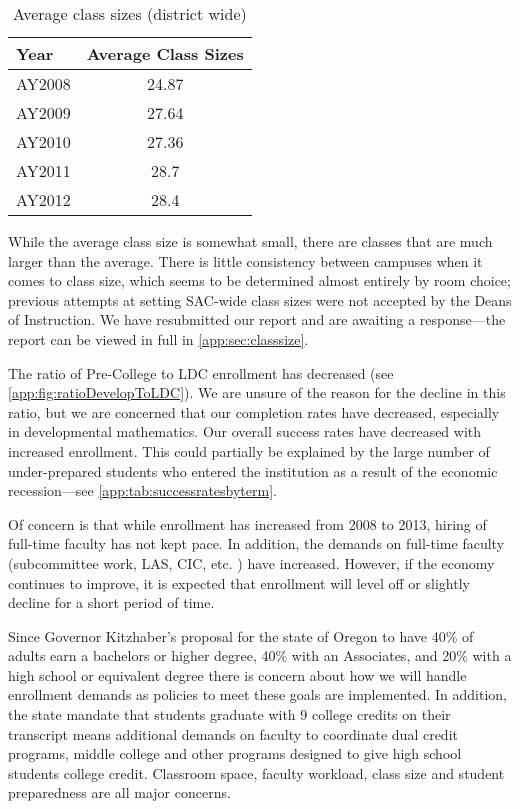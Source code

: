 \begin{table}[!htb]
	\centering
	\caption{Average class sizes (district wide)}
	\label{needs:tab:averageclasssize}
	\begin{tabular}{lS[table-format=2.2]}
		\toprule
		Year   & {Average Class Sizes } \\
		\midrule
		AY2008 & 24.87                  \\
		AY2009 & 27.64                  \\
		AY2010 & 27.36                  \\
		AY2011 & 28.7                   \\
		AY2012 & 28.4                   \\
		\bottomrule
	\end{tabular}
\end{table}

While the average class size is somewhat small, there are classes that are much larger than the average.
There is little consistency between campuses when it comes to class size, which seems to be determined almost entirely by room choice; previous attempts at setting SAC-wide class sizes were not accepted by the Deans of Instruction.
We have resubmitted our report and are awaiting a response---the report \label{needs:page:classsize} can be viewed in full in \vref{app:sec:classsize}.

The ratio of Pre-College to LDC enrollment has decreased (see \vref{app:fig:ratioDevelopToLDC}).
We are unsure of the reason for the decline in this ratio, but we are concerned that our completion rates have decreased, especially in developmental mathematics.
Our overall success rates have decreased with increased enrollment.
This could partially be explained by the large number of under-prepared students who entered the institution as a result of the economic recession---see \vref{app:tab:successratesbyterm}.

Of concern is that while enrollment has increased from 2008 to 2013, hiring of full-time faculty has not kept pace.
In addition, the demands on full-time faculty (subcommittee work, LAS, CIC,  etc.
) have increased.
However, if the economy continues to improve, it is expected that enrollment will level off or slightly decline for a short period of time.

Since Governor Kitzhaber's proposal for the state of Oregon to have 40\% of adults earn a bachelors or higher degree, 40\% with an Associates, and 20\% with a high school or equivalent degree there is concern about how we will handle enrollment demands as policies to meet these goals are implemented.
In addition, the state mandate that students graduate with 9 college credits on their transcript means additional demands on faculty to coordinate dual credit programs, middle college and other programs designed to give high school students college credit.
Classroom space, faculty workload, class size and student preparedness are all major concerns.

